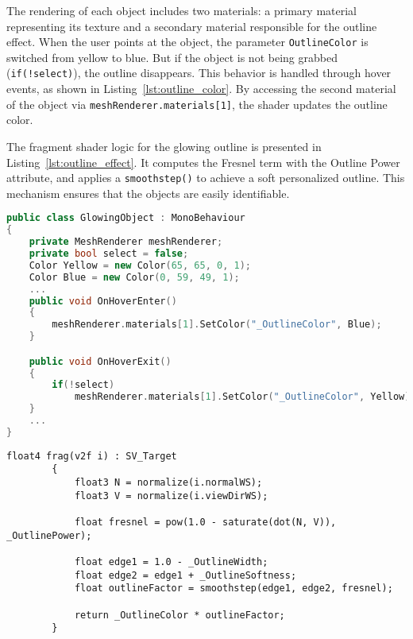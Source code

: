 The rendering of each object includes two materials: a primary material representing its texture and a secondary material responsible for the outline effect.
When the user points at the object, the parameter \texttt{OutlineColor} is switched from yellow to blue. But if the object is not being grabbed (\texttt{if(!select)}), the outline disappears. 
This behavior is handled through hover events, as shown in Listing~\ref{lst:outline_color}. 
By accessing the second material of the object via \texttt{meshRenderer.materials[1]}, the shader updates the outline color.  

The fragment shader logic for the glowing outline is presented in Listing~\ref{lst:outline_effect}. 
It computes the Fresnel term with the Outline Power attribute, and applies a \texttt{smoothstep()} to achieve a soft personalized outline.  
This mechanism ensures that the objects are easily identifiable. 

\newpage
\begin{lstlisting}[language=C++, caption={Partial class with Outline Color changed when the object is Hovered.}, label={lst:outline_color}]
    public class GlowingObject : MonoBehaviour
{
    private MeshRenderer meshRenderer;
    private bool select = false;
    Color Yellow = new Color(65, 65, 0, 1);
    Color Blue = new Color(0, 59, 49, 1);
    ...
    public void OnHoverEnter()
    {
        meshRenderer.materials[1].SetColor("_OutlineColor", Blue);
    }

    public void OnHoverExit()
    {
        if(!select)
            meshRenderer.materials[1].SetColor("_OutlineColor", Yellow);
    }
    ...
}
\end{lstlisting}


\begin{lstlisting}[language=HLSL, caption={Partial Fragment shader for creating an outline effect to the object.}, label={lst:outline_effect}]
        float4 frag(v2f i) : SV_Target
        {
            float3 N = normalize(i.normalWS);
            float3 V = normalize(i.viewDirWS);

            float fresnel = pow(1.0 - saturate(dot(N, V)), _OutlinePower);

            float edge1 = 1.0 - _OutlineWidth;
            float edge2 = edge1 + _OutlineSoftness;
            float outlineFactor = smoothstep(edge1, edge2, fresnel);

            return _OutlineColor * outlineFactor;
        }
\end{lstlisting}

